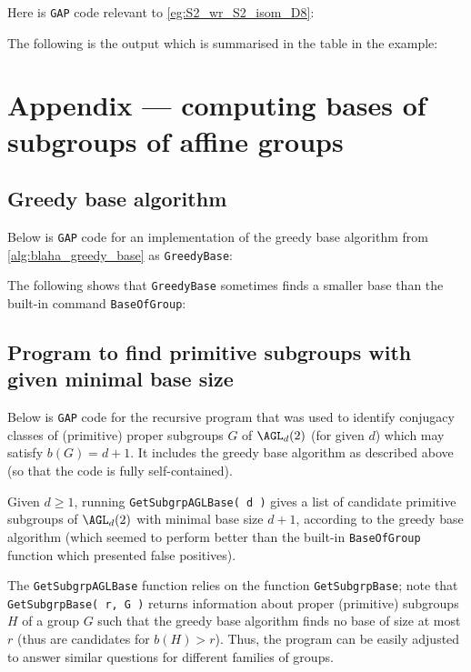 Here is \texttt{GAP} code relevant to \autoref{eg:S2_wr_S2_isom_D8}:



The following is the output which is summarised in the table in the example:



\chapter{Appendix --- computing bases of subgroups of affine groups}%

\section{Greedy base algorithm}

Below is \texttt{GAP} code for an implementation of the greedy base algorithm from \autoref{alg:blaha_greedy_base} as \texttt{GreedyBase}:\label{app:greedy_base}



The following shows that \texttt{GreedyBase} sometimes finds a smaller base than the built-in command \texttt{BaseOfGroup}:\label{app:greedy_better_than_default}



\section{Program to find primitive subgroups with given minimal base size}

Below is \texttt{GAP} code for the recursive program that was used to identify conjugacy classes of (primitive) proper subgroups $G$ of $\AGL_d(2)$ (for given $d$) which may satisfy $b(G) = d + 1$. It includes the greedy base algorithm as described above (so that the code is fully self-contained).

Given $d \geq 1$, running \texttt{GetSubgrpAGLBase( d )} gives a list of candidate primitive subgroups of $\AGL_d(2)$ with minimal base size $d + 1$, according to the greedy base algorithm (which seemed to perform better than the built-in \texttt{BaseOfGroup} function which presented false positives).

The \texttt{GetSubgrpAGLBase} function relies on the function \texttt{GetSubgrpBase}; note that \texttt{GetSubgrpBase( r, G )} returns information about proper (primitive) subgroups $H$ of a group $G$ such that the greedy base algorithm finds no base of size at most $r$ (thus are candidates for $b(H) > r$). Thus, the program can be easily adjusted to answer similar questions for different families of groups.\label{app:subgrps_base_len}

